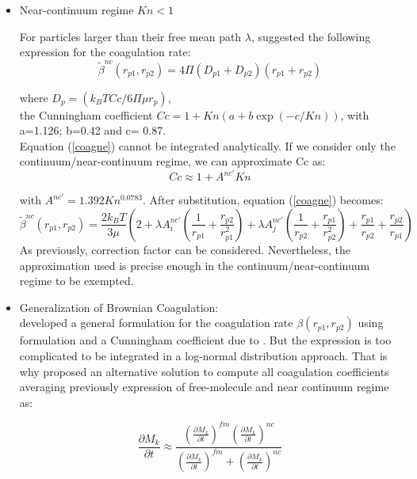 \begin{itemize}
\item Near-continuum regime $Kn < 1$

For particles larger than their free mean path $\lambda$,
\citet{Friedlander1977} suggested
the following  expression for the coagulation rate:
\begin{equation}
\widetilde{\beta}^{nc}(r_{p1},r_{p2}) = 4 \Pi (D_{p1} + D_{p2}) (r_{p1} + 
r_{p2})
\label{coagne}
\end{equation}

where $D_{p} = (k_B T Cc / 6 \Pi \mu r_p)$,\\
the Cunningham coefficient $Cc=1 + 
Kn(a+b \exp(-c/Kn))$, with  a=1.126; b=0.42 and c= 0.87. \\
Equation (\ref{coagne}) cannot be integrated analytically. If we consider only the 
continuum/near-continuum regime, we can approximate Cc as:
\begin{equation}
Cc \approx 1 + A^{nc'} Kn
\label{Cc}
\end{equation}

with $ A^{nc'} = 1.392 Kn^{0.0783}$. After substitution, equation (\ref{coagne}) 
becomes:
\begin{equation}
\widetilde{\beta}^{nc}(r_{p1},r_{p2}) = \frac{2 k_B T}{3 \mu}\left(2+\lambda 
A^{nc'}_i 
\left(\frac{1}{r_{p1}} + \frac{r_{p2}}{r_{p1}^2}\right) + \lambda A^{nc'}_j 
\left(\frac{1}{r_{p2}} + \frac{r_{p1}}{r_{p2}^2}\right) + \frac{r_{p1}}{r_{p2}}
+ \frac{r_{p2}}{r_{p1}}\right)
\label{coagne_cor}
\end{equation}
As previously, correction factor can be considered. Nevertheless, the 
approximation used is
precise enough in the continuum/near-continuum regime to be exempted.

\item Generalization of Brownian Coagulation:\\
\citet{Seinfeld1997} developed a general formulation for the coagulation rate $
\beta(r_{p1},r_{p2})$ using \citet{Fuchs1964} formulation and a Cunningham 
coefficient
due to \citet{Philips1975}. But the expression is too complicated to be 
integrated in
a log-normal distribution approach.
That is why \citet{Whitby1991} proposed an alternative solution to compute all 
coagulation coefficients averaging previously expression of free-molecule and 
near continuum regime as:

\begin{equation}
\frac{\partial M_k}{\partial t}  \approx \frac{ (\frac{\partial M_k}{\partial 
t})^{fm} (\frac{\partial M_k}{\partial t})^{nc}}
{(\frac{\partial M_k}{\partial t})^{fm} +  (\frac{\partial M_k}{\partial 
t})^{nc}}
\end{equation}

\end{itemize}

